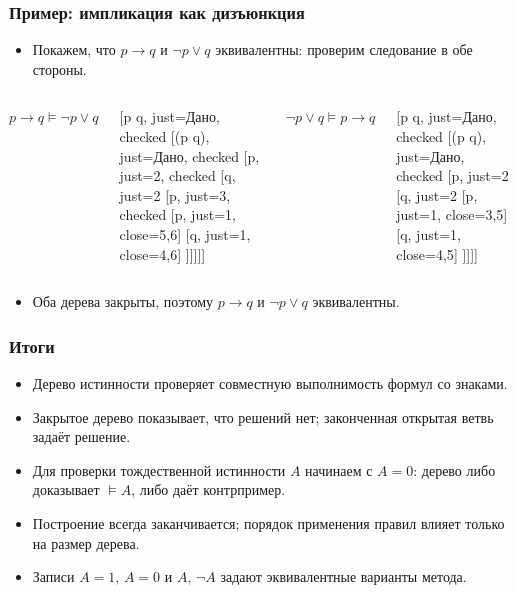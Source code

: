 \documentclass[10pt]{beamer}
\begin{document}
\begin{frame}
\frametitle{Пример: импликация как дизъюнкция}
\begin{itemize}
    \item Покажем, что $p \to q$ и $\neg p \lor q$ эквивалентны: проверим следование в обе стороны.
\end{itemize}
\begin{columns}[T,onlytextwidth]
\centering
$p \to q \vDash \neg p \lor q$
{\footnotesize
\begin{tableau}{}
    [{p \to q}, just=Дано, checked
    [{\neg(\neg p \lor q)}, just=Дано, checked
    [{\neg\neg p}, just=2, checked
    [{\neg q}, just=2
    [{p}, just=3, checked
    [{\neg p}, just=1, close={5,6}]
    [{q}, just=1, close={4,6}]
    ]]]]]
\end{tableau}
}
\centering
$\neg p \lor q \vDash p \to q$
{\footnotesize
\begin{tableau}{}
    [{\neg p \lor q}, just=Дано, checked
    [{\neg(p \to q)}, just=Дано, checked
    [{p}, just=2
    [{\neg q}, just=2
    [{\neg p}, just=1, close={3,5}]
    [{q}, just=1, close={4,5}]
    ]]]]
\end{tableau}
}
\end{columns}
\begin{itemize}
    \item Оба дерева закрыты, поэтому $p \to q$ и $\neg p \lor q$ эквивалентны.
\end{itemize}
\end{frame}

\begin{frame}
\frametitle{Итоги}
\begin{itemize}
    \item Дерево истинности проверяет совместную выполнимость формул со знаками.
    \item Закрытое дерево показывает, что решений нет; законченная открытая ветвь задаёт решение.
    \item Для проверки тождественной истинности $A$ начинаем с $A=0$: дерево либо доказывает $\vDash A$, либо даёт контрпример.
    \item Построение всегда заканчивается; порядок применения правил влияет только на размер дерева.
    \item Записи $A=1,\,A=0$ и $A,\,\neg A$ задают эквивалентные варианты метода.
\end{itemize}
\end{frame}
\end{document}
